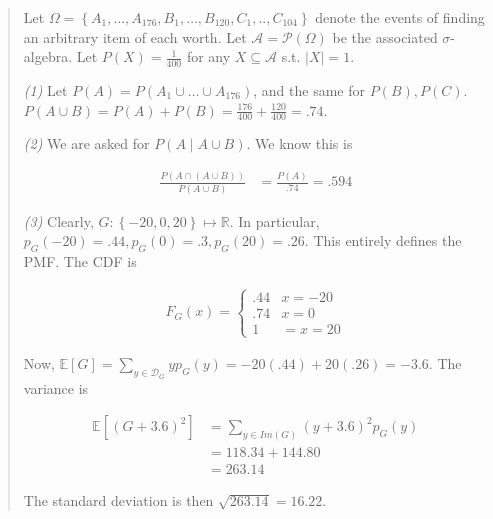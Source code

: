\documentclass[a4paper, 12pt]{article}
\begin{document}
\small
\begin{quote}

    Let $\Omega = \left\{ A_{1}, \ldots, A_{176}, B_{1}, \ldots, B_{120}, C_{1},
    .., C_{104}\right\} $ denote the events of finding an arbitrary item of each
    worth. Let $\mathcal{A} = \mathcal{P}(\Omega)$ be the associated
    $\sigma$-algebra. Let $P(X) = \frac{1}{400}$ for any $X \subseteq
    \mathcal{A}$ s.t. $|X| = 1$.

    \textit{(1)} Let $P(A) = P(A_1 \cup \ldots \cup A_{176})$, and the same for
    $P(B), P(C)$. $P(A \cup B) = P(A) + P(B) = \frac{176}{400} + \frac{120}{400}
    = .74$.

    \textit{(2)} We are asked for $P(A \mid A \cup B)$. We know this is 

    \begin{align*}
        \frac{P\left( A \cap \left( A \cup B \right)  \right)}{P(A \cup B)} &=
        \frac{P(A)}{.74} = .594
    \end{align*}


    \textit{(3)} Clearly, $G : \left\{ -20, 0, 20 \right\} \mapsto \mathbb{R}$. In
    particular, $p_{G}(-20) = .44, p_{G}(0) = .3, p_{G}(20) = .26$. This entirely
    defines the PMF. The CDF is 
    
    \begin{align*}
        F_{G}(x) = \begin{cases}
            .44 & x = -20 \\ 
             .74 & x = 0 \\ 
             1 &= x = 20
        \end{cases}
    \end{align*}

    Now, $\mathbb{E}\left[ G \right] = \sum_{y \in   \mathcal{D}_{G}} yp_G(y) =
    -20(.44) + 20(.26) = -3.6$. The variance is 

    \begin{align*}
        \mathbb{E}\left[ (G + 3.6)^2 \right] &= \sum_{y \in Im(G)} (y +
        3.6)^2p_G(y) \\ 
                                             &= 118.34 + 144.80 \\ 
                                             &= 263.14
    \end{align*}

    The standard deviation is then $\sqrt{263.14} = 16.22 $.
    

\end{quote}
\normalsize
\end{document}
